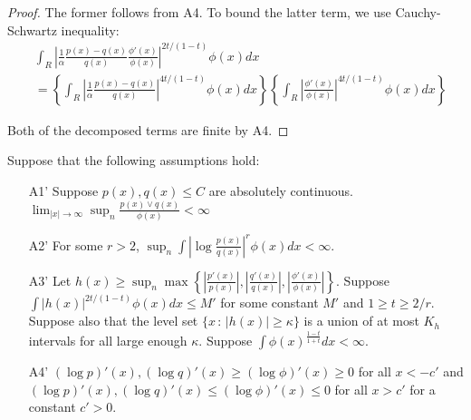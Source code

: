 \documentclass{article}
\begin{document}
\begin{proof}
The former follows from A4. To bound the latter term, we use Cauchy-Schwartz inequality:
\begin{align*}
& \int_R  \left| \frac{1}{\alpha} \frac{p(x) - q(x)}{q(x)}  \frac{\phi'(x)}{\phi(x)}\right|^{2t/(1-t)} \phi(x) dx \\
& =  \left\{ \int_R  \left| \frac{1}{\alpha} \frac{p(x) - q(x)}{q(x)}  \right|^{4t/(1-t)} \phi(x) dx 
     \right\}
   \left\{    \int_R \left| \frac{\phi'(x)}{\phi(x)}\right|^{4t/(1-t)} \phi(x) dx \right\}
\end{align*}

Both of the decomposed terms are finite by A4.

\end{proof}



\begin{proposition}
\label{prop:transformation2}
Suppose that the following assumptions hold:
\begin{enumerate}
\item[A1'] Suppose $p(x), q(x) \leq C$ are absolutely continuous.  $\lim_{|x| \rightarrow \infty} \sup_n \frac{p(x) \vee q(x)}{\phi(x)} < \infty$
\item[A2'] For some $r > 2$, $\sup_n \int \left| \log \frac{p(x)}{q(x)} \right|^r \phi(x) dx < \infty$.
\item[A3'] {Let $h(x) \geq \sup_n \max \left\{  \left|\frac{p'(x)}{p(x)} \right|, 
 \left|\frac{q'(x)}{q(x)}\right|, \left| \frac{\phi'(x)}{\phi(x)}\right| \right\} $. Suppose $\int |h(x)|^{2t/(1-t)} \phi(x) dx \leq M'$ for some constant $M'$ and $1 \geq t \geq 2/r$. Suppose also that the level set $\{x \,:\, |h(x)| \geq \kappa\}$ is a union of at most $K_h$ intervals for all large enough $\kappa$. Suppose $\int \phi(x)^{\frac{1-t}{1+t}} dx < \infty$.}
\item[A4']  $(\log p)'(x), (\log q)'(x) \geq (\log \phi)'(x) \geq 0$ for all $x < -c'$ and $ (\log p)'(x), (\log q)'(x) \leq (\log \phi)'(x) \leq 0$ for all $x > c'$ for a constant $c' > 0$.
\end{enumerate}


\end{proposition}
\end{document}
